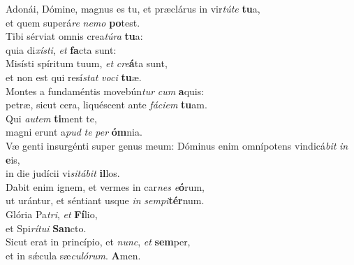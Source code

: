 \evenverse Adonái, Dómine, magnus es tu, et præclárus in vir\textit{tú}\textit{te} \textbf{tu}a,~\*\\
\evenverse et quem superá\textit{re} \textit{ne}\textit{mo} \textbf{po}test.\\
\oddverse Tibi sérviat omnis crea\textit{tú}\textit{ra} \textbf{tu}a:~\*\\
\oddverse quia di\textit{xí}\textit{sti}, \textit{et} \textbf{fa}cta sunt:\\
\evenverse Misísti spíritum tuum, \textit{et} \textit{cre}\textbf{á}ta sunt,~\*\\
\evenverse et non est qui resí\textit{stat} \textit{vo}\textit{ci} \textbf{tu}æ.\\
\oddverse Montes a fundaméntis movebún\textit{tur} \textit{cum} \textbf{a}quis:~\*\\
\oddverse petræ, sicut cera, liquéscent ante \textit{fá}\textit{ci}\textit{em} \textbf{tu}am.\\
\evenverse Qui \textit{au}\textit{tem} \textbf{ti}ment te,~\*\\
\evenverse magni erunt a\textit{pud} \textit{te} \textit{per} \textbf{óm}nia.\\
\oddverse Væ genti insurgénti super genus meum: Dóminus enim omnípotens vindicá\textit{bit} \textit{in} \textbf{e}is,~\*\\
\oddverse in die judícii vi\textit{si}\textit{tá}\textit{bit} \textbf{il}los.\\
\evenverse Dabit enim ignem, et vermes in car\textit{nes} \textit{e}\textbf{ó}rum,~\*\\
\evenverse ut urántur, et séntiant usque \textit{in} \textit{sem}\textit{pi}\textbf{tér}num.\\
\oddverse Glória Pa\textit{tri}, \textit{et} \textbf{Fí}lio,~\*\\
\oddverse et Spi\textit{rí}\textit{tu}\textit{i} \textbf{San}cto.\\
\evenverse Sicut erat in princípio, et \textit{nunc}, \textit{et} \textbf{sem}per,~\*\\
\evenverse et in sǽcula sæ\textit{cu}\textit{ló}\textit{rum}. \textbf{A}men.\\
